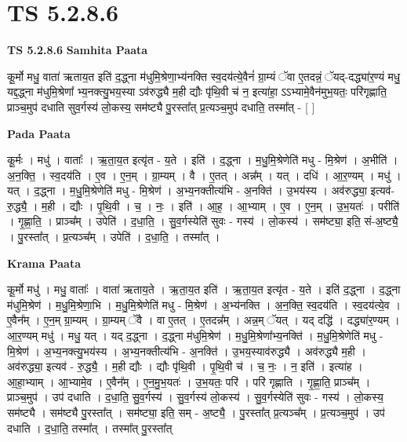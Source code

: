 \documentclass[17pt]{extarticle}
\begin{document}
\section{ TS 5.2.8.6 }

\textbf{TS 5.2.8.6 } \newline
\textbf{Samhita Paata} \newline

कू॒र्मो मधु॒ वाता॑ ऋताय॒त इति॑ द॒द्ध्ना म॑धुमि॒श्रेणा॒भ्य॑नक्ति स्व॒दय॑त्ये॒वैनं॑ ग्रा॒म्यं ॅवा ए॒तदन्नं॒ ॅयद्-दद्ध्या॑र॒ण्यं मधु॒ यद्द॒द्ध्ना म॑धुमि॒श्रेणा᳚ भ्य॒नक्त्यु॒भय॒स्या ऽव॑रुद्ध्यै म॒ही द्यौः पृ॑थि॒वी च॑ न॒ इत्या॑हा॒ ऽऽभ्यामे॒वैन॑मुभ॒यतः॒ परि॑गृह्णाति॒ प्राञ्च॒मुप॑ दधाति सुव॒र्गस्य॑ लो॒कस्य॒ सम॑ष्ट्यै पु॒रस्ता᳚त् प्र॒त्यञ्च॒मुप॑ दधाति॒ तस्मा᳚त् - [  ] \newline

\textbf{Pada Paata} \newline

कू॒र्मः । मधु॑ । वाताः᳚ । ऋ॒ता॒य॒त इत्यृ॑त - य॒ते । इति॑ । द॒द्ध्ना । म॒धु॒मि॒श्रेणेति॑ मधु - मि॒श्रेण॑ । अ॒भीति॑ । अ॒न॒क्ति॒ । स्व॒दय॑ति । ए॒व । ए॒न॒म् । ग्रा॒म्यम् । वै । ए॒तत् । अन्न᳚म् । यत् । दधि॑ । आ॒र॒ण्यम् । मधु॑ । यत् । द॒द्ध्ना । म॒धु॒मि॒श्रेणेति॑ मधु - मि॒श्रेण॑ । अ॒भ्य॒नक्तीत्य॑भि - अ॒नक्ति॑ । उ॒भय॑स्य । अव॑रुद्ध्या॒ इत्यव॑-रु॒द्ध्यै॒ । म॒ही । द्यौः । पृ॒थि॒वी । च॒ । नः॒ । इति॑ । आ॒ह॒ । आ॒भ्याम् । ए॒व । ए॒न॒म् । उ॒भ॒यतः॑ । परीति॑ । गृ॒ह्णा॒ति॒ । प्राञ्च᳚म् । उपेति॑ । द॒धा॒ति॒ । सु॒व॒र्गस्येति॑ सुवः - गस्य॑ । लो॒कस्य॑ । सम॑ष्ट्या॒ इति॒ सं-अ॒ष्ट्यै॒ । पु॒रस्ता᳚त् । प्र॒त्यञ्च᳚म् । उपेति॑ । द॒धा॒ति॒ । तस्मा᳚त् ।  \newline


\textbf{Krama Paata} \newline

कू॒र्मो मधु॑ । मधु॒ वाताः᳚ । वाता॑ ऋताय॒ते । ऋ॒ता॒य॒त इति॑ । ऋ॒ता॒य॒त इत्यृ॑त - य॒ते । इति॑ द॒द्ध्ना । द॒द्ध्ना म॑धुमि॒श्रेण॑ । म॒धु॒मि॒श्रेणा॒भि । म॒धु॒मि॒श्रेणेति॑ मधु - मि॒श्रेण॑ । अ॒भ्य॑नक्ति । अ॒न॒क्ति॒ स्व॒दय॑ति । स्व॒दय॑त्ये॒व । ए॒वैन᳚म् । ए॒न॒म् ग्रा॒म्यम् । ग्रा॒म्यम् ॅवै । वा ए॒तत् । ए॒तदन्न᳚म् । अन्न॒म् ॅयत् । यद् दद्धि॑ । दद्ध्या॑र॒ण्यम् । आ॒र॒ण्यम् मधु॑ । मधु॒ यत् । यद् द॒द्ध्ना । द॒द्ध्ना म॑धुमि॒श्रेण॑ । म॒धु॒मि॒श्रेणा᳚भ्य॒नक्ति॑ । म॒धु॒मि॒श्रेणेति॑ मधु - मि॒श्रेण॑ । अ॒भ्य॒नक्त्यु॒भय॑स्य । अ॒भ्य॒नक्तीत्य॑भि - अ॒नक्ति॑ । उ॒भय॒स्याव॑रुद्ध्यै । अव॑रुद्ध्यै म॒ही । अव॑रुद्ध्या॒ इत्यव॑ - रु॒द्ध्यै॒ । म॒ही द्यौः । द्यौः पृ॑थि॒वी । पृ॒थि॒वी च॑ । च॒ नः॒ । न॒ इति॑ । इत्या॑ह । आ॒हा॒भ्याम् । आ॒भ्यामे॒व । ए॒वैन᳚म् । ए॒न॒मु॒भ॒यतः॑ । उ॒भ॒यतः॒ परि॑ । परि॑ गृह्णाति । गृ॒ह्णा॒ति॒ प्राञ्च᳚म् । प्राञ्च॒मुप॑ । उप॑ दधाति । द॒धा॒ति॒ सु॒व॒र्गस्य॑ । सु॒व॒र्गस्य॑ लो॒कस्य॑ । सु॒व॒र्गस्येति॑ सुवः - गस्य॑ । लो॒कस्य॒ सम॑ष्ट्यै । सम॑ष्ट्यै पु॒रस्ता᳚त् । सम॑ष्ट्या॒ इति॒ सम् - अ॒ष्ट्यै॒ । पु॒रस्ता᳚त् प्र॒त्यञ्च᳚म् । प्र॒त्यञ्च॒मुप॑ । उप॑ दधाति । द॒धा॒ति॒ तस्मा᳚त् । तस्मा᳚त् पु॒रस्ता᳚त् \newline
\end{document}
